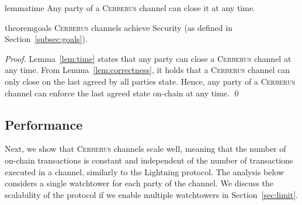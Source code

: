 \documentclass[runningheads]{llncs}
\newcommand{\sys}{\textsc{Cerberus}\xspace}
\begin{document}
\vspace{-4pt}
\begin{restatable}{lemma}{time}\label{lem:time}
Any party of a \sys channel can close it at any time.
\end{restatable}

\vspace{-4pt}
\begin{restatable}{theorem}{goals}
\sys channels achieve Security (as defined in Section~\ref{subsec:goals}).
\end{restatable}
\begin{proof}
Lemma~\ref{lem:time} states that any party can close a \sys channel at any time. From Lemma~\ref{lem:correctness}, it holds that a \sys channel can only close on the last agreed by all parties state. Hence, any party of a \sys channel can enforce the last agreed state on-chain at any time.
\hfill \qed
\end{proof}

\subsection{Performance}

Next, we show that \sys channels scale well, meaning that the number of on-chain transactions is constant and independent of the number of transactions executed in a channel, similarly to the Lightning protocol. The analysis below considers a single watchtower for each party of the channel. We discuss the scalability of the protocol if we enable multiple watchtowers in Section~\ref{sec:limit}.
\end{document}
